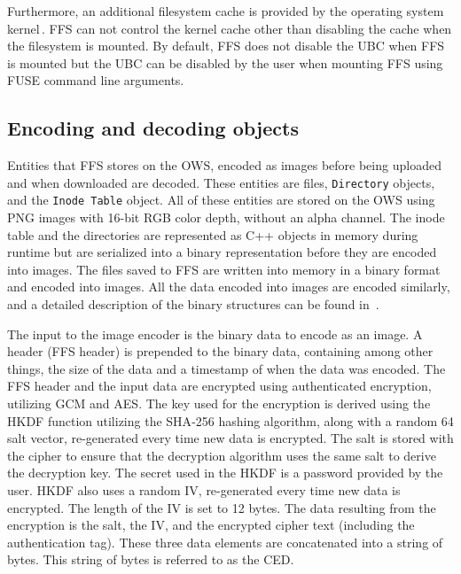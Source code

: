 Furthermore, an additional filesystem cache is provided by the operating system kernel\,\cite{fleischerMountOptionsOsxfuse2020, gowdappaExperiencesFUSEReal2019}. \gls{FFS} can not control the kernel cache other than disabling the cache when the filesystem is mounted. By default, \gls{FFS} does not disable the \gls{UBC} when \gls{FFS} is mounted but the \gls{UBC} can be disabled by the user when mounting \gls{FFS} using \gls{FUSE} command line arguments.

\subsection{Encoding and decoding objects}
\label{subsec:file_enc_dec}
Entities that \gls{FFS} stores on the \gls{OWS}, encoded as images before being uploaded and when downloaded are decoded. These entities are files, \texttt{Directory} objects, and the \texttt{Inode Table} object. All of these entities are stored on the \gls{OWS} using PNG images with \mbox{16-bit} \gls{RGB} color depth, without an alpha channel. The inode table and the directories are represented as C++ objects in memory during runtime but are serialized into a binary representation before they are encoded into images. The files saved to \gls{FFS} are written into memory in a binary format and encoded into images. All the data encoded into images are encoded similarly, and a detailed description of the binary structures can be found in~. 

The input to the image encoder is the binary data to encode as an image. A header (\gls{FFS} header) is prepended to the binary data, containing among other things, the size of the data and a timestamp of when the data was encoded. The \gls{FFS} header and the input data are encrypted using authenticated encryption, utilizing \gls{GCM} and \gls{AES}. The key used for the encryption is derived using the \gls{HKDF} function utilizing the \mbox{\gls{SHA}-256} hashing algorithm, along with a random \SI{64}{\byte} salt vector, \mbox{re-generated} every time new data is encrypted. The salt is stored with the cipher to ensure that the decryption algorithm uses the same salt to derive the decryption key. The secret used in the \gls{HKDF} is a password provided by the user. \gls{HKDF} also uses a random \gls{IV}, \mbox{re-generated} every time new data is encrypted. The length of the \gls{IV} is set to 12 bytes. The data resulting from the encryption is the salt, the \gls{IV}, and the encrypted cipher text (including the authentication tag). These three data elements are concatenated into a string of bytes. This string of bytes is referred to as the \gls{CED}.

